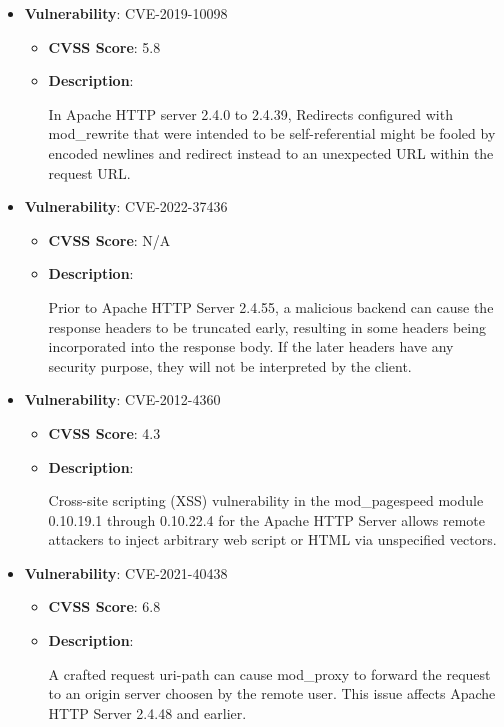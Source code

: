 \documentclass{article}
\begin{document}
\begin{itemize}
        \item \textbf{Vulnerability}: CVE-2019-10098
        \begin{itemize}
            \item \textbf{CVSS Score}:  5.8 
            \item \textbf{Description}:
            \parbox[t]{0.9\linewidth}{
                \ttfamily In Apache HTTP server 2.4.0 to 2.4.39, Redirects configured with mod\_rewrite that were intended to be self-referential might be fooled by encoded newlines and redirect instead to an unexpected URL within the request URL.
            }
        \end{itemize}
    
        \item \textbf{Vulnerability}: CVE-2022-37436
        \begin{itemize}
            \item \textbf{CVSS Score}:  N/A 
            \item \textbf{Description}:
            \parbox[t]{0.9\linewidth}{
                \ttfamily Prior to Apache HTTP Server 2.4.55, a malicious backend can cause the response headers to be truncated early, resulting in some headers being incorporated into the response body. If the later headers have any security purpose, they will not be interpreted by the client.
            }
        \end{itemize}
    
        \item \textbf{Vulnerability}: CVE-2012-4360
        \begin{itemize}
            \item \textbf{CVSS Score}:  4.3 
            \item \textbf{Description}:
            \parbox[t]{0.9\linewidth}{
                \ttfamily Cross-site scripting (XSS) vulnerability in the mod\_pagespeed module 0.10.19.1 through 0.10.22.4 for the Apache HTTP Server allows remote attackers to inject arbitrary web script or HTML via unspecified vectors.
            }
        \end{itemize}
    
        \item \textbf{Vulnerability}: CVE-2021-40438
        \begin{itemize}
            \item \textbf{CVSS Score}:  6.8 
            \item \textbf{Description}:
            \parbox[t]{0.9\linewidth}{
                \ttfamily A crafted request uri-path can cause mod\_proxy to forward the request to an origin server choosen by the remote user. This issue affects Apache HTTP Server 2.4.48 and earlier.
            }
        \end{itemize}
    

\end{itemize}
\end{document}
